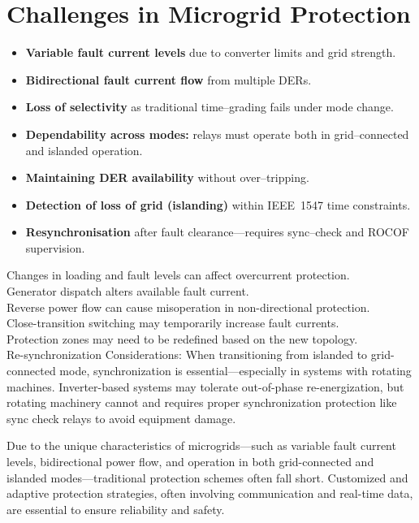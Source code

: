 \section{Challenges in Microgrid Protection}
\begin{itemize}
    \item \textbf{Variable fault current levels} due to converter limits and grid strength.
    \item \textbf{Bidirectional fault current flow} from multiple DERs.
    \item \textbf{Loss of selectivity} as traditional time–grading fails under mode change.
    \item \textbf{Dependability across modes:} relays must operate both in grid–connected and islanded operation.
    \item \textbf{Maintaining DER availability} without over–tripping.
    \item \textbf{Detection of loss of grid (islanding)} within IEEE~1547 time constraints.
    \item \textbf{Resynchronisation} after fault clearance—requires sync–check and ROCOF supervision.
\end{itemize}


Changes in loading and fault levels can affect overcurrent protection.\\
Generator dispatch alters available fault current.\\
Reverse power flow can cause misoperation in non-directional protection.\\
Close-transition switching may temporarily increase fault currents.\\
Protection zones may need to be redefined based on the new topology.\\
Re-synchronization Considerations: When transitioning from islanded to grid-connected mode, synchronization is essential—especially in systems with rotating machines. Inverter-based systems may tolerate out-of-phase re-energization, but rotating machinery cannot and requires proper synchronization protection like sync check relays to avoid equipment damage.

Due to the unique characteristics of microgrids—such as variable fault current levels, bidirectional power flow, and operation in both grid-connected and islanded modes—traditional protection schemes often fall short. Customized and adaptive protection strategies, often involving communication and real-time data, are essential to ensure reliability and safety.




